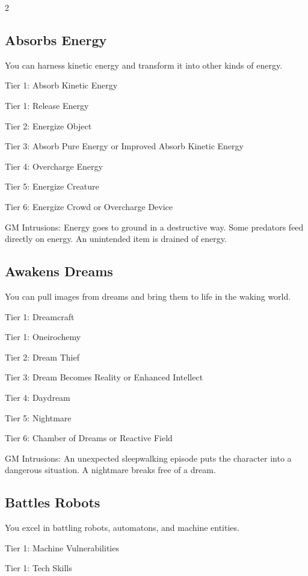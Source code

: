 \begin{multicols}{2}
\subsection{Absorbs Energy}

You can harness kinetic energy and transform it into other kinds of energy.

Tier 1: Absorb Kinetic Energy

Tier 1: Release Energy

Tier 2: Energize Object

Tier 3: Absorb Pure Energy or Improved Absorb Kinetic Energy 

Tier 4: Overcharge Energy

Tier 5: Energize Creature

Tier 6: Energize Crowd or Overcharge Device

GM Intrusions: Energy goes to ground in a destructive way. Some predators feed directly on energy. An unintended item is drained of energy.

\subsection{Awakens Dreams}

You can pull images from dreams and bring them to life in the waking world.

Tier 1: Dreamcraft

Tier 1: Oneirochemy

Tier 2: Dream Thief

Tier 3: Dream Becomes Reality or Enhanced Intellect

Tier 4: Daydream

Tier 5: Nightmare

Tier 6: Chamber of Dreams or Reactive Field

GM Intrusions: An unexpected sleepwalking episode puts the character into a dangerous situation. A nightmare breaks free of a dream.

\subsection{Battles Robots}

You excel in battling robots, automatons, and machine entities.

Tier 1: Machine Vulnerabilities

Tier 1: Tech Skills


\end{multicols}
